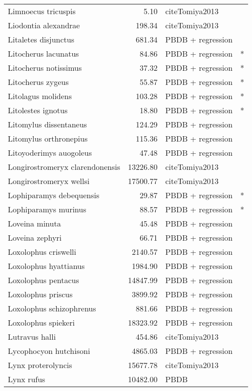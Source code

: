 \begin{table}[ht]
\begin{tabular}{lrll}
  Limnoecus tricuspis & 5.10 & cite{Tomiya2013} &  \\ 
  Liodontia alexandrae & 198.34 & cite{Tomiya2013} &  \\ 
  Litaletes disjunctus & 681.34 & PBDB + regression &  \\ 
  Litocherus lacunatus & 84.86 & PBDB + regression & * \\ 
  Litocherus notissimus & 37.32 & PBDB + regression & * \\ 
  Litocherus zygeus & 55.87 & PBDB + regression & * \\ 
  Litolagus molidens & 103.28 & PBDB + regression & * \\ 
  Litolestes ignotus & 18.80 & PBDB + regression & * \\ 
  Litomylus dissentaneus & 124.29 & PBDB + regression &  \\ 
  Litomylus orthronepius & 115.36 & PBDB + regression &  \\ 
  Litoyoderimys auogoleus & 47.48 & PBDB + regression &  \\ 
  Longirostromeryx clarendonensis & 13226.80 & cite{Tomiya2013} &  \\ 
  Longirostromeryx wellsi & 17500.77 & cite{Tomiya2013} &  \\ 
  Lophiparamys debequensis & 29.87 & PBDB + regression & * \\ 
  Lophiparamys murinus & 88.57 & PBDB + regression & * \\ 
  Loveina minuta & 45.48 & PBDB + regression &  \\ 
  Loveina zephyri & 66.71 & PBDB + regression &  \\ 
  Loxolophus criswelli & 2140.57 & PBDB + regression &  \\ 
  Loxolophus hyattianus & 1984.90 & PBDB + regression &  \\ 
  Loxolophus pentacus & 14847.99 & PBDB + regression &  \\ 
  Loxolophus priscus & 3899.92 & PBDB + regression &  \\ 
  Loxolophus schizophrenus & 881.66 & PBDB + regression &  \\ 
  Loxolophus spiekeri & 18323.92 & PBDB + regression &  \\ 
  Lutravus halli & 454.86 & cite{Tomiya2013} &  \\ 
  Lycophocyon hutchisoni & 4865.03 & PBDB + regression &  \\ 
  Lynx proterolyncis & 15677.78 & cite{Tomiya2013} &  \\ 
  Lynx rufus & 10482.00 & PBDB &  \\ 

\end{tabular}
\end{table}
